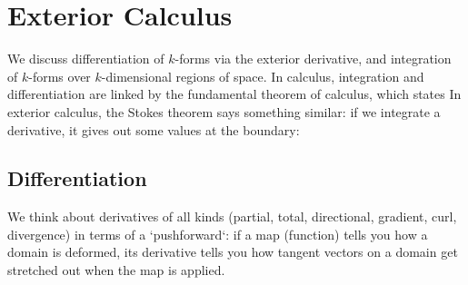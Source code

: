 \section{Exterior Calculus}
We discuss differentiation of $k$-forms via the exterior derivative, and integration of $k$-forms over $k$-dimensional regions of space. In calculus, integration and differentiation are linked by the fundamental theorem of calculus, which states
In exterior calculus, the Stokes theorem says something similar: if we integrate a derivative, it gives out some values at the boundary:

\subsection{Differentiation}
We think about derivatives of all kinds (partial, total, directional, gradient, curl, divergence) in terms of a `pushforward`: if a map (function) tells you how a domain is deformed, its derivative tells you how tangent vectors on a domain get stretched out when the map is applied.

